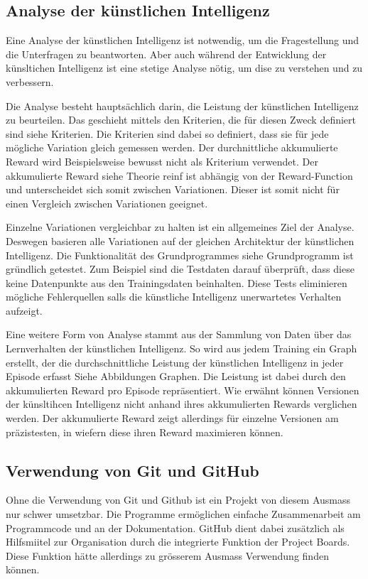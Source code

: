 \subsection{Analyse der künstlichen Intelligenz}
Eine Analyse der künstlichen Intelligenz ist notwendig, um die Fragestellung und
die Unterfragen zu beantworten. Aber auch während der Entwicklung der
künsltichen Intelligenz ist eine stetige Analyse nötig, um dise zu verstehen und
zu verbessern.

Die Analyse besteht hauptsächlich darin, die Leistung der künstlichen
Intelligenz zu beurteilen. Das geschieht mittels den Kriterien, die für diesen
Zweck definiert sind {siehe Kriterien}. Die Kriterien sind dabei so definiert,
dass sie für jede mögliche Variation gleich gemessen werden. Der durchnittliche
akkumulierte Reward wird Beispielsweise bewusst nicht als Kriterium verwendet.
Der akkumulierte Reward {siehe Theorie reinf} ist abhängig von der Reward-Function und unterscheidet
sich somit zwischen Variationen. Dieser ist somit nicht für einen Vergleich
zwischen Variationen geeignet.

Einzelne Variationen vergleichbar zu halten ist ein allgemeines Ziel der
Analyse. Deswegen basieren alle Variationen auf der gleichen Architektur der
künstlichen Intelligenz. Die Funktionalität des Grundprogrammes {siehe
Grundprogramm} ist gründlich getestet. Zum Beispiel sind die Testdaten darauf
überprüft, dass diese keine Datenpunkte aus den Trainingsdaten beinhalten. Diese
Tests eliminieren mögliche Fehlerquellen salls die künstliche Intelligenz
unerwartetes Verhalten aufzeigt.

Eine weitere Form von Analyse stammt aus der Sammlung von Daten über das
Lernverhalten der künstlichen Intelligenz. So wird aus jedem Training ein Graph
erstellt, der die durchschnittliche Leistung der künstlichen Intelligenz in
jeder Episode erfasst {Siehe Abbildungen Graphen}. Die Leistung ist dabei durch
den akkumulierten Reward pro Episode repräsentiert. Wie erwähnt können Versionen
der künsltihcen Intelligenz nicht anhand ihres akkumulierten Rewards verglichen
werden. Der akkumulierte Reward zeigt allerdings für einzelne Versionen am
präzistesten, in wiefern diese ihren Reward maximieren können.




\subsection{Verwendung von Git und GitHub}
Ohne die Verwendung von Git und Github ist ein Projekt von diesem Ausmass nur
schwer umsetzbar. Die Programme ermöglichen einfache Zusammenarbeit am
Programmcode und an der Dokumentation. GitHub dient dabei zusätzlich als
Hilfsmiitel zur Organisation durch die integrierte Funktion der Project Boards.
Diese Funktion hätte allerdings zu grösserem Ausmass Verwendung finden können.

